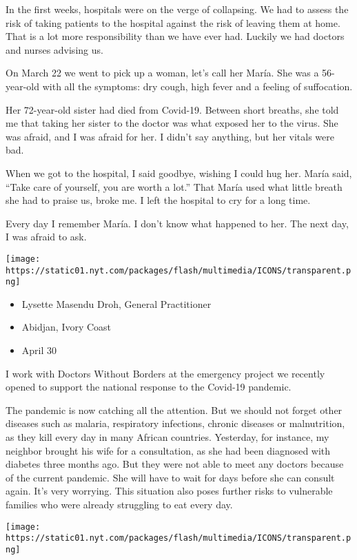 In the first weeks, hospitals were on the verge of collapsing. We had to
assess the risk of taking patients to the hospital against the risk of
leaving them at home. That is a lot more responsibility than we have
ever had. Luckily we had doctors and nurses advising us.

On March 22 we went to pick up a woman, let's call her María. She was a
56-year-old with all the symptoms: dry cough, high fever and a feeling
of suffocation.

Her 72-year-old sister had died from Covid-19. Between short breaths,
she told me that taking her sister to the doctor was what exposed her to
the virus. She was afraid, and I was afraid for her. I didn't say
anything, but her vitals were bad.

When we got to the hospital, I said goodbye, wishing I could hug her.
María said, ``Take care of yourself, you are worth a lot.'' That María
used what little breath she had to praise us, broke me. I left the
hospital to cry for a long time.

Every day I remember María. I don't know what happened to her. The next
day, I was afraid to ask.

\texttt{[image: https://static01.nyt.com/packages/flash/multimedia/ICONS/transparent.png]}

\begin{itemize}
\tightlist
\item
  Lysette Masendu Droh, General Practitioner
\item
  Abidjan, Ivory Coast
\item
  April 30
\end{itemize}

I work with Doctors Without Borders at the emergency project we recently
opened to support the national response to the Covid-19 pandemic.

The pandemic is now catching all the attention. But we should not forget
other diseases such as malaria, respiratory infections, chronic diseases
or malnutrition, as they kill every day in many African countries.
Yesterday, for instance, my neighbor brought his wife for a
consultation, as she had been diagnosed with diabetes three months ago.
But they were not able to meet any doctors because of the current
pandemic. She will have to wait for days before she can consult again.
It's very worrying. This situation also poses further risks to
vulnerable families who were already struggling to eat every day.

\texttt{[image: https://static01.nyt.com/packages/flash/multimedia/ICONS/transparent.png]}

